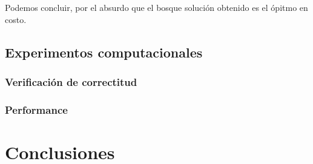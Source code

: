 \documentclass[a4paper, 10pt, twoside]{article}
\begin{document}
Podemos concluir, por el absurdo que el bosque solución obtenido es el ópitmo en costo.
\subsection{Experimentos computacionales}
\subsubsection{Verificación de correctitud}

\subsubsection{Performance}





\newpage

\section{Conclusiones}






\newpage
\end{document}
